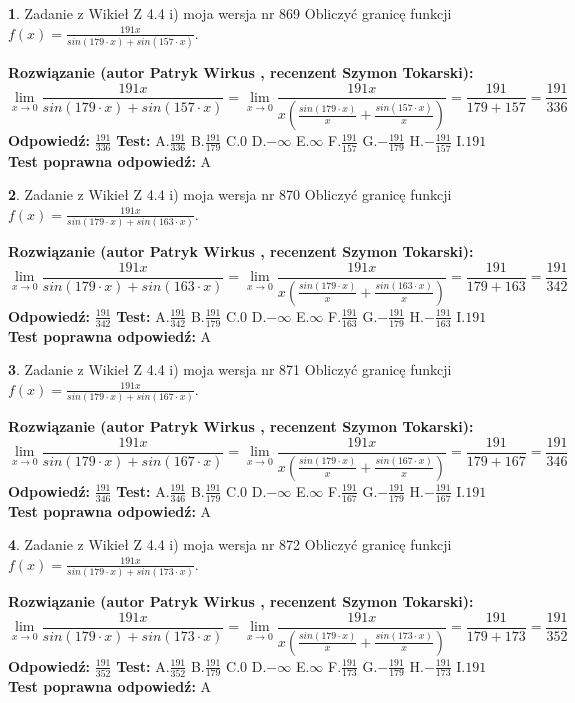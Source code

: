\documentclass[12pt, a4paper]{article}
\theoremstyle{definition} %
\newtheorem{zad}{}
\newcommand{\zadStart}[1]{\begin{zad}#1\newline}
\newcommand{\zadStop}{\end{zad}}
\newcommand{\rozwStart}[2]{\noindent \textbf{Rozwiązanie (autor #1 , recenzent #2): }\newline}
\newcommand{\rozwStop}{\newline}
\newcommand{\odpStart}{\noindent \textbf{Odpowiedź:}\newline}
\newcommand{\odpStop}{\newline}
\newcommand{\testStart}{\noindent \textbf{Test:}\newline}
\newcommand{\testStop}{\newline}
\newcommand{\kluczStart}{\noindent \textbf{Test poprawna odpowiedź:}\newline}
\newcommand{\kluczStop}{\newline}
\begin{document}
\zadStart{Zadanie z Wikieł Z 4.4 i) moja wersja nr 869}
Obliczyć granicę funkcji $f(x)=\frac{191x}{sin(179\cdot x) +sin(157\cdot x)}$.
\zadStop
\rozwStart{Patryk Wirkus}{Szymon Tokarski}
$$\lim\limits_{x\to 0}\frac{191x}{sin(179\cdot x) +sin(157\cdot x)}=\lim\limits_{x\to 0}\frac{191x}{x(\frac{sin(179\cdot x)}{x}+\frac{sin(157\cdot x)}{x})}=\frac{191}{179+157} = \frac{191}{336}$$
\rozwStop
\odpStart
$\frac{191}{336}$
\odpStop
\testStart
A.$\frac{191}{336}$
B.$\frac{191}{179}$
C.$0$
D.$-\infty$
E.$\infty$
F.$\frac{191}{157}$
G.$-\frac{191}{179}$
H.$-\frac{191}{157}$
I.$191$
\testStop
\kluczStart
A
\kluczStop



\zadStart{Zadanie z Wikieł Z 4.4 i) moja wersja nr 870}
Obliczyć granicę funkcji $f(x)=\frac{191x}{sin(179\cdot x) +sin(163\cdot x)}$.
\zadStop
\rozwStart{Patryk Wirkus}{Szymon Tokarski}
$$\lim\limits_{x\to 0}\frac{191x}{sin(179\cdot x) +sin(163\cdot x)}=\lim\limits_{x\to 0}\frac{191x}{x(\frac{sin(179\cdot x)}{x}+\frac{sin(163\cdot x)}{x})}=\frac{191}{179+163} = \frac{191}{342}$$
\rozwStop
\odpStart
$\frac{191}{342}$
\odpStop
\testStart
A.$\frac{191}{342}$
B.$\frac{191}{179}$
C.$0$
D.$-\infty$
E.$\infty$
F.$\frac{191}{163}$
G.$-\frac{191}{179}$
H.$-\frac{191}{163}$
I.$191$
\testStop
\kluczStart
A
\kluczStop



\zadStart{Zadanie z Wikieł Z 4.4 i) moja wersja nr 871}
Obliczyć granicę funkcji $f(x)=\frac{191x}{sin(179\cdot x) +sin(167\cdot x)}$.
\zadStop
\rozwStart{Patryk Wirkus}{Szymon Tokarski}
$$\lim\limits_{x\to 0}\frac{191x}{sin(179\cdot x) +sin(167\cdot x)}=\lim\limits_{x\to 0}\frac{191x}{x(\frac{sin(179\cdot x)}{x}+\frac{sin(167\cdot x)}{x})}=\frac{191}{179+167} = \frac{191}{346}$$
\rozwStop
\odpStart
$\frac{191}{346}$
\odpStop
\testStart
A.$\frac{191}{346}$
B.$\frac{191}{179}$
C.$0$
D.$-\infty$
E.$\infty$
F.$\frac{191}{167}$
G.$-\frac{191}{179}$
H.$-\frac{191}{167}$
I.$191$
\testStop
\kluczStart
A
\kluczStop



\zadStart{Zadanie z Wikieł Z 4.4 i) moja wersja nr 872}
Obliczyć granicę funkcji $f(x)=\frac{191x}{sin(179\cdot x) +sin(173\cdot x)}$.
\zadStop
\rozwStart{Patryk Wirkus}{Szymon Tokarski}
$$\lim\limits_{x\to 0}\frac{191x}{sin(179\cdot x) +sin(173\cdot x)}=\lim\limits_{x\to 0}\frac{191x}{x(\frac{sin(179\cdot x)}{x}+\frac{sin(173\cdot x)}{x})}=\frac{191}{179+173} = \frac{191}{352}$$
\rozwStop
\odpStart
$\frac{191}{352}$
\odpStop
\testStart
A.$\frac{191}{352}$
B.$\frac{191}{179}$
C.$0$
D.$-\infty$
E.$\infty$
F.$\frac{191}{173}$
G.$-\frac{191}{179}$
H.$-\frac{191}{173}$
I.$191$
\testStop
\kluczStart
A
\kluczStop
\end{document}
